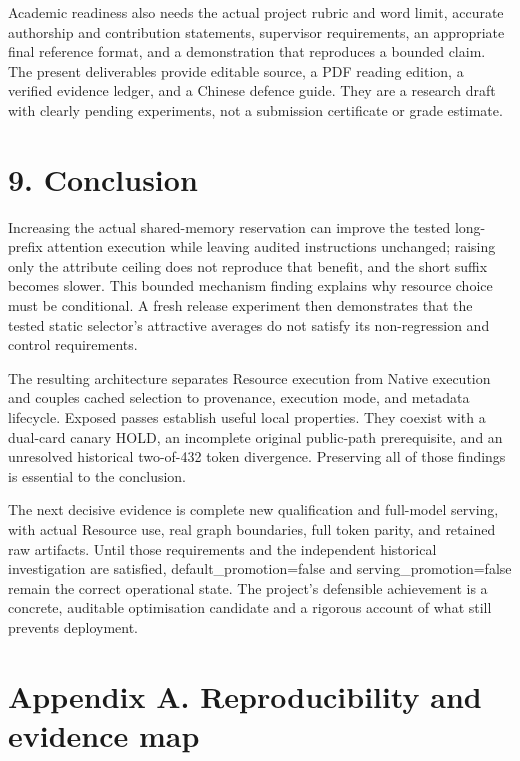 \documentclass[11pt,a4paper]{article}
\begin{document}
Academic readiness also needs the actual project rubric and word limit, accurate authorship and contribution statements, supervisor requirements, an appropriate final reference format, and a demonstration that reproduces a bounded claim. The present deliverables provide editable source, a PDF reading edition, a verified evidence ledger, and a Chinese defence guide. They are a research draft with clearly pending experiments, not a submission certificate or grade estimate.


\clearpage

\section*{9. Conclusion}


Increasing the actual shared-memory reservation can improve the tested long-prefix attention execution while leaving audited instructions unchanged; raising only the attribute ceiling does not reproduce that benefit, and the short suffix becomes slower. This bounded mechanism finding explains why resource choice must be conditional. A fresh release experiment then demonstrates that the tested static selector's attractive averages do not satisfy its non-regression and control requirements.


The resulting architecture separates Resource execution from Native execution and couples cached selection to provenance, execution mode, and metadata lifecycle. Exposed passes establish useful local properties. They coexist with a dual-card canary HOLD, an incomplete original public-path prerequisite, and an unresolved historical two-of-432 token divergence. Preserving all of those findings is essential to the conclusion.


The next decisive evidence is complete new qualification and full-model serving, with actual Resource use, real graph boundaries, full token parity, and retained raw artifacts. Until those requirements and the independent historical investigation are satisfied, default\_promotion=false and serving\_promotion=false remain the correct operational state. The project's defensible achievement is a concrete, auditable optimisation candidate and a rigorous account of what still prevents deployment.


\clearpage

\section*{Appendix A. Reproducibility and evidence map}
\end{document}

